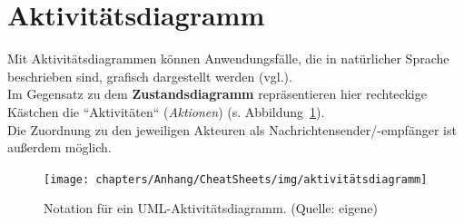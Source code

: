 \section{Aktivitätsdiagramm}
Mit Aktivitätsdiagrammen können Anwendungsfälle, die in natürlicher Sprache beschrieben sind, grafisch dargestellt werden (vgl.\cite[304 ff.]{Oes05}).\\
Im Gegensatz zu dem \textbf{Zustandsdiagramm} repräsentieren hier rechteckige Kästchen die ``Aktivitäten`` (\textit{Aktionen}) (s. Abbildung~\ref{fig:aktivitätsdiagramm}).\\
Die Zuordnung zu den jeweiligen Akteuren als Nachrichtensender/-empfänger ist außerdem möglich.


\begin{figure}
    \centering
    \texttt{[image: chapters/Anhang/CheatSheets/img/aktivitätsdiagramm]}
    \caption{Notation für ein UML-Aktivitätsdiagramm. (Quelle: eigene)}
    \label{fig:aktivitätsdiagramm}
\end{figure}
